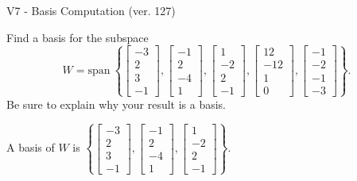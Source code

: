 \begin{exercise}
  \begin{exerciseTitle}V7 - Basis Computation (ver. 127)\end{exerciseTitle}
  \begin{exerciseStatement}
    Find a basis for the subspace 
\[W=\mathrm{span}\ \left\{\left[\begin{array}{r}
-3 \\
2 \\
3 \\
-1
\end{array}\right] , \left[\begin{array}{r}
-1 \\
2 \\
-4 \\
1
\end{array}\right] , \left[\begin{array}{r}
1 \\
-2 \\
2 \\
-1
\end{array}\right] , \left[\begin{array}{r}
12 \\
-12 \\
1 \\
0
\end{array}\right] , \left[\begin{array}{r}
-1 \\
-2 \\
-1 \\
-3
\end{array}\right]\right\}.\]
 Be sure to explain why your result is a basis.


  \end{exerciseStatement}
  \begin{exerciseAnswer}
   A basis of \(W\) is  \(\left\{\left[\begin{array}{r}
-3 \\
2 \\
3 \\
-1
\end{array}\right] , \left[\begin{array}{r}
-1 \\
2 \\
-4 \\
1
\end{array}\right] , \left[\begin{array}{r}
1 \\
-2 \\
2 \\
-1
\end{array}\right]\right\}\).
  


  \end{exerciseAnswer}
\end{exercise}